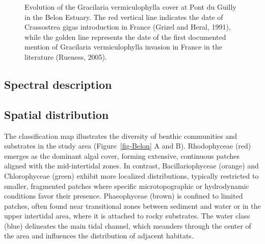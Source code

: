 \documentclass[
  letterpaper,
  DIV=11,
  numbers=noendperiod]{scrartcl}
\begin{document}
\label{cell-fig-HistoricalPlot}
\begin{figure}[H]


\caption{\label{fig-HistoricalPlot}Evolution of the Gracilaria
vermiculophylla cover at Pont du Guilly in the Belon Estuary. The red
vertical line indicates the date of Crassostrea gigas introduction in
France (Grizel and Heral, 1991), while the golden line represents the
date of the first documented mention of Gracilaria vermiculophylla
invasion in France in the literature (Rueness, 2005).}

\end{figure}%

\subsection{Spectral description}\label{spectral-description}

\subsection{Spatial distribution}\label{spatial-distribution}

The classification map illustrates the diversity of benthic communities
and substrates in the study area (Figure~\ref{fig-Belon} A and B).
Rhodophyceae (red) emerges as the dominant algal cover, forming
extensive, continuous patches aligned with the mid-intertidal zones. In
contrast, Bacillariophyceae (orange) and Chlorophyceae (green) exhibit
more localized distributions, typically restricted to smaller,
fragmented patches where specific microtopographic or hydrodynamic
conditions favor their presence. Phaeophyceae (brown) is confined to
limited patches, often found near transitional zones between sediment
and water or in the upper intertidal area, where it is attached to rocky
substrates. The water class (blue) delineates the main tidal channel,
which meanders through the center of the area and influences the
distribution of adjacent habitats.
\end{document}
